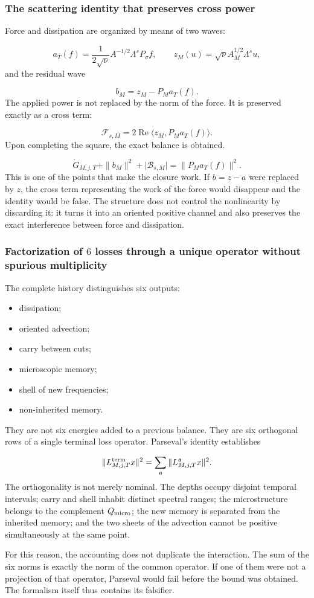 \subsubsection{The scattering identity that preserves cross power}
Force and dissipation are organized by means of two waves:\par
\[
a_T(f)
=
\frac{1}{2\sqrt\nu}A^{-1/2}\Lambda^sP_\sigma f,
\qquad
z_M(u)=\sqrt\nu A_M^{1/2}\Lambda^su,
\]
and the residual wave\par
\[
b_M=z_M-P_Ma_T(f).
\]
The applied power is not replaced by the norm of the force. It is preserved exactly as a cross term:\par
\[
\mathscr F_{s,M}
=
2\operatorname{Re}\langle z_M,P_Ma_T(f)\rangle.
\]
Upon completing the square, the exact balance is obtained.\par
\[
\dot G_{M,j,T}
+\|b_M\|^2
+\lvert\mathscr B_{s,M}\rvert
=
\|P_Ma_T(f)\|^2.
\]
This is one of the points that make the closure work. If \(b=z-a\) were replaced by \(z\), the cross term representing the work of the force would disappear and the identity would be false. The structure does not control the nonlinearity by discarding it: it turns it into an oriented positive channel and also preserves the exact interference between force and dissipation.\par
{}
\subsubsection{Factorization of \(6\) losses through a unique operator without spurious multiplicity}
The complete history distinguishes six outputs:\par
\begin{itemize}
\item dissipation;
\item oriented advection;
\item carry between cuts;
\item microscopic memory;
\item shell of new frequencies;
\item non-inherited memory.
\end{itemize}
They are not six energies added to a previous balance. They are six orthogonal rows of a single terminal loss operator. Parseval's identity establishes\par
\[
\|L_{M,j,T}^{\rm term}x\|^2
=
\sum_{\mathfrak a}
\|L_{M,j,T}^{\mathfrak a}x\|^2.
\]
The orthogonality is not merely nominal. The depths occupy disjoint temporal intervals; carry and shell inhabit distinct spectral ranges; the microstructure belongs to the complement \(Q_{\rm micro}\); the new memory is separated from the inherited memory; and the two sheets of the advection cannot be positive simultaneously at the same point.\par
For this reason, the accounting does not duplicate the interaction. The sum of the six norms is exactly the norm of the common operator. If one of them were not a projection of that operator, Parseval would fail before the bound was obtained. The formalism itself thus contains its falsifier.\par
{}
